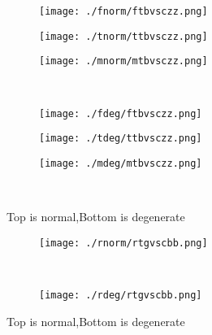 \documentclass[aps,floats,floatfix,nofootinbib]{revtex4-1}
\begin{document}
\begin{center}
\begin{figure}
\begin{subfigure}{0.3\textwidth}
\texttt{[image: ./fnorm/ftbvsczz.png]}
\label{}
\end{subfigure}
\begin{subfigure}{0.3\textwidth}
\texttt{[image: ./tnorm/ttbvsczz.png]}
\label{}
\end{subfigure}
\begin{subfigure}{0.3\textwidth}
\texttt{[image: ./mnorm/mtbvsczz.png]}
\label{}
\end{subfigure}\\
\begin{subfigure}{0.3\textwidth}
\texttt{[image: ./fdeg/ftbvsczz.png]}
\label{}
\end{subfigure}
\begin{subfigure}{0.3\textwidth}
\texttt{[image: ./tdeg/ttbvsczz.png]}
\label{}
\end{subfigure}
\begin{subfigure}{0.3\textwidth}
\texttt{[image: ./mdeg/mtbvsczz.png]}
\label{}
\end{subfigure}\\
\caption{Top is normal,Bottom is degenerate}
\end{figure}
\end{center}

\begin{center}
\begin{figure}
\begin{subfigure}{0.95\textwidth}
\texttt{[image: ./rnorm/rtgvscbb.png]}
\label{}
\end{subfigure}\\
\begin{subfigure}{0.95\textwidth}
\texttt{[image: ./rdeg/rtgvscbb.png]}
\label{}
\end{subfigure}
\caption{Top is normal,Bottom is degenerate}
\end{figure}
\end{center}
\end{document}
